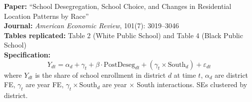 \documentclass[11pt,a4paper]{article}
\begin{document}
\textbf{Paper:} ``School Desegregation, School Choice, and Changes in Residential Location Patterns by Race''\\
\textbf{Journal:} \textit{American Economic Review}, 101(7): 3019--3046\\
\textbf{Tables replicated:} Table 2 (White Public School) and Table 4 (Black Public School)\\
\textbf{Specification:}
\[
Y_{dt} = \alpha_d + \gamma_t + \beta \cdot \text{PostDeseg}_{dt} + (\gamma_t \times \text{South}_d) + \varepsilon_{dt}
\]
where $Y_{dt}$ is the share of school enrollment in district $d$ at time $t$, $\alpha_d$ are district FE, $\gamma_t$ are year FE, $\gamma_t \times \text{South}_d$ are year $\times$ South interactions. SEs clustered by district.

\vspace{0.3cm}
\noindent{}
\end{document}
